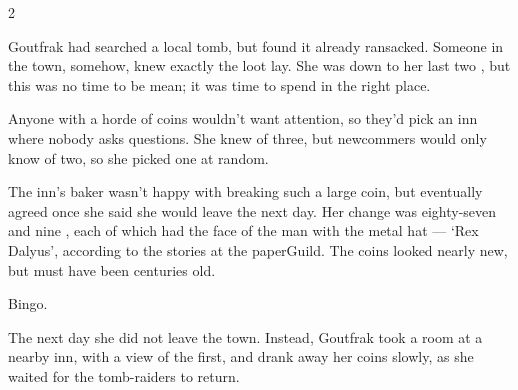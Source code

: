 \begin{multicols}{2}
\begin{exampletext}
  Goutfrak had searched a local tomb, but found it already ransacked.
  Someone in the town, somehow, knew exactly the loot lay.
  She was down to her last two , but this was no time to be
  mean; it was time to spend in the right place.

  Anyone with a horde of \glspl{coin} wouldn't want attention, so they'd pick an inn where
  nobody asks questions.
  She knew of three, but newcommers would only know of two, so she picked one at random.

  The inn's \gls{baker} wasn't happy with breaking such a large \gls{coin}, but eventually agreed once she said she would leave the next day.
  Her change was eighty-seven  and nine , each of which had the face of the man with the metal hat --- `Rex Dalyus', according to the stories at the \gls{paperGuild}.
  The \glspl{coin} looked nearly new, but must have been centuries old.

  Bingo.

  The next day she did not leave the town.
  Instead, Goutfrak took a room at a nearby inn, with a view of the first, and drank away her \glspl{coin} slowly, as she waited for the tomb-raiders to return.

\end{exampletext}

\end{multicols}
